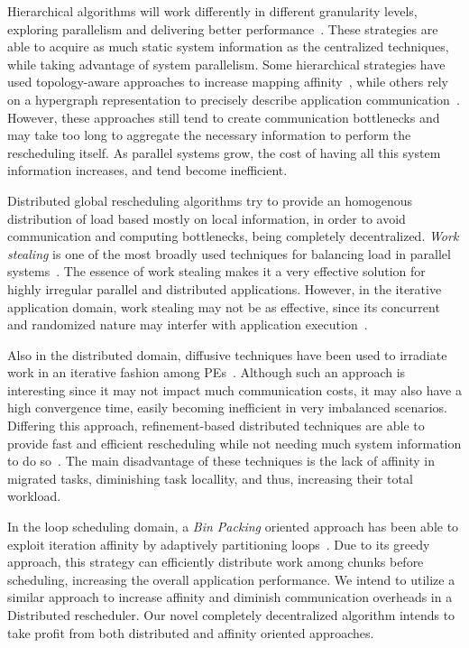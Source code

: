 Hierarchical algorithms will work differently in different granularity levels, exploring parallelism and delivering better performance~\cite{nuco,hybrid}.
These strategies are able to acquire as much static system information as the centralized techniques, while taking advantage of system parallelism.
Some hierarchical strategies have used topology-aware approaches to increase mapping affinity~\cite{nuco,hwtopo}, while others rely on a hypergraph representation to precisely describe application communication~\cite{ZoltanParHypRepart07}.
However, these approaches still tend to create communication bottlenecks and may take too long to aggregate the necessary information to perform the rescheduling itself.
As parallel systems grow, the cost of having all this system information increases, and tend become inefficient.

Distributed global rescheduling algorithms try to provide an homogenous distribution of load based mostly on local information, in order to avoid communication and computing bottlenecks, being completely decentralized.
\textit{Work stealing} is one of the most broadly used techniques for balancing load in parallel systems~\cite{DBLP:journals/ijpp/YangH18,Janjic2013}.
The essence of work stealing makes it a very effective solution for highly irregular parallel and distributed applications.
However, in the iterative application domain, work stealing may not be as effective, since its concurrent and randomized nature may interfer with application execution~\cite{lifflander2012work}.

Also in the distributed domain, diffusive techniques have been used to irradiate work in an iterative fashion among PEs~\cite{diffus}.
Although such an approach is interesting since it may not impact much communication costs, it may also have a high convergence time, easily becoming inefficient in very imbalanced scenarios.
Differing this approach, refinement-based distributed techniques are able to provide fast and efficient rescheduling while not needing much system information to do so~\cite{grapevine}.
The main disadvantage of these techniques is the lack of affinity in migrated tasks, diminishing task locallity, and thus, increasing their total workload.

In the loop scheduling domain, a \textit{Bin Packing} oriented approach has been able to exploit iteration affinity by adaptively partitioning loops~\cite{Castro-Penna-WSCAD:2017}.
Due to its greedy approach, this strategy can efficiently distribute work among chunks before scheduling, increasing the overall application performance.
We intend to utilize a similar approach to increase affinity and diminish communication overheads in a Distributed rescheduler.
Our novel completely decentralized algorithm intends to take profit from both distributed and affinity oriented approaches.



